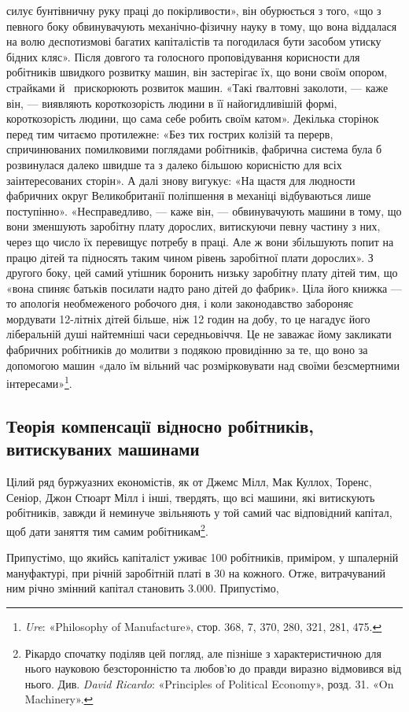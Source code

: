 \parcont{}  %
силує бунтівничну руку праці до покірливости», він обурюється
з того, «що з певного боку обвинувачують механічно-фізичну
науку в тому, що вона віддалася на волю деспотизмові багатих
капіталістів та погодилася бути засобом утиску бідних кляс».
Після довгого та голосного проповідування корисности для робітників
швидкого розвитку машин, він застерігає їх, що вони своїм
опором, страйками й~ прискорюють розвиток машин. «Такі
ґвалтовні заколоти, — каже він, — виявляють короткозорість людини
в її найогидливішій формі, короткозорість людини, що сама
себе робить своїм катом». Декілька сторінок перед тим читаємо
протилежне: «Без тих гострих колізій та перерв, спричинюваних
помилковими поглядами робітників, фабрична система була б
розвинулася далеко швидше та з далеко більшою корисністю
для всіх заінтересованих сторін». А далі знову вигукує: «На
щастя для людности фабричних округ Великобританії поліпшення
в механіці відбуваються лише поступінно». «Несправедливо, —
каже він, — обвинувачують машини в тому, що вони зменшують
заробітну плату дорослих, витискуючи певну частину з них, через
що число їх перевищує потребу в праці. Але ж вони збільшують
попит на працю дітей та підносять таким чином рівень заробітної
плати дорослих». З другого боку, цей самий утішник боронить
низьку заробітну плату дітей тим, що «вона спиняє батьків посилати
надто рано дітей до фабрик». Ціла його книжка — то апологія
необмеженого робочого дня, і коли законодавство забороняє
мордувати 12-літніх дітей більше, ніж 12 годин на добу, то це
нагадує його ліберальній душі найтемніші часи середньовіччя.
Це не заважає йому закликати фабричних робітників до молитви
з подякою провидінню за те, що воно за допомогою машин
«дало їм вільний час розмірковувати над своїми безсмертними
інтересами»\footnote{
\emph{Ure}: «Philosophy of Manufacture», стор. 368, 7, 370, 280, 321, 281, 475.
}.

\subsection{Теорія компенсації відносно робітників, витискуваних
машинами}

Цілий ряд буржуазних економістів, як от Джемс Мілл, Мак
Куллох, Торенс, Сеніор, Джон Стюарт Мілл і інші, твердять,
що всі машини, які витискують робітників, завжди й неминуче
звільняють у той самий час відповідний капітал, щоб дати заняття
тим самим робітникам\footnote{
Рікардо спочатку поділяв цей погляд, але пізніше з характеристичною
для нього науковою безсторонністю та любов’ю до правди виразно
відмовився від нього. Див. \emph{David Ricardo}: «Principles of Political
Economy», розд. 31. «On Machinery».
}.

Припустімо, що якийсь капіталіст уживає 100 робітників,
приміром, у шпалерній мануфактурі, при річній заробітній платі
в 30 на кожного. Отже, витрачуваний ним річно
змінний капітал становить \num{3.000}. Припустімо,
\parbreak{}  %
